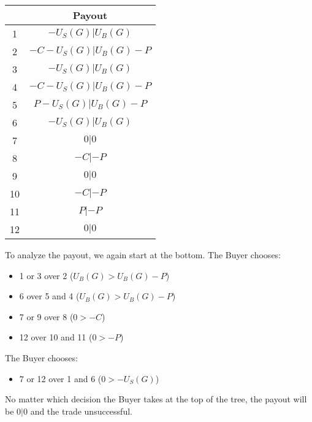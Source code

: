 \documentclass{cacthesis}
\begin{document}
\begin{center}
\begin{tabular}{ |c|c| }
\hline
& Payout  \\
\hline
\hline
1& $-U_S(G)| U_B(G)$\\
\hline
2& $-C-U_S(G)|U_B(G) -P$\\
\hline
3&$-U_S(G)|U_B(G)$ \\
\hline
4& $-C-U_S(G)|U_B(G)-P$ \\
\hline
5& $P-U_S(G)| U_B(G) - P$\\
\hline 
6& $-U_S(G)|U_B(G)$\\
\hline
7& $0|0$\\
\hline
8& $-C | -P$\\
\hline
9& $0|0$\\
\hline
10& $-C|-P$\\
\hline
11& $P| -P$\\
\hline
12& $0| 0$\\
\hline
\end{tabular}
\end{center}
To analyze the payout, we again start at the bottom. The Buyer chooses:
\begin{itemize}
    \item 1 or 3 over 2 ($U_B(G) > U_B(G) - P$)
    \item 6 over 5 and 4  ($U_B(G) > U_B(G) - P$)
    \item 7 or 9 over 8 ($0 > -C$)
    \item 12 over 10 and 11 ($0 > -P$)
\end{itemize}
The Buyer chooses:
\begin{itemize}
    \item 7 or 12 over 1 and 6 ($0>-U_S(G)$)
\end{itemize}
No matter which decision the Buyer takes at the top of the tree, the payout will be $0|0$ and the trade unsuccessful.
\end{document}
